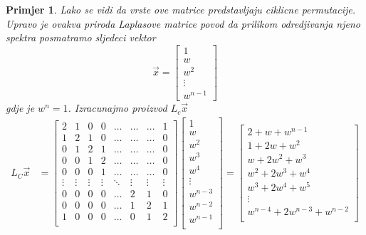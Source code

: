 \documentclass[11pt]{article}
\newtheorem{example}{Primjer}
\begin{document}
\begin{example}
	
	Lako se vidi da vrste ove matrice predstavljaju ciklicne permutacije. Upravo je ovakva priroda Laplasove matrice povod da prilikom odredjivanja njeno spektra posmatramo sljedeci vektor 
	\[ \vec{x} =
	\begin{bmatrix}
	1 \\
	w \\
	w^2\\
	\vdots \\
	w^{n-1}
	\end{bmatrix}
	\]
	gdje je $w^n = 1$. Izracunajmo proizvod $L_c \vec{x}$
	\[
	\begin{split}
	  	L_C \vec{x} & = 
		\begin{bmatrix}
		2 & 1 & 0 & 0 & \dots & \dots & \dots & 1 \\
		1 & 2 & 1 & 0 & \dots & \dots & \dots & 0 \\
		0 & 1 & 2 & 1 & \dots & \dots & \dots & 0 \\
		0 & 0 & 1 & 2 & \dots & \dots & \dots & 0 \\
		0 & 0 & 0 & 1 & \dots & \dots & \dots & 0 \\
		\vdots  & \vdots  & \vdots  & \vdots  & \ddots & \vdots & \vdots & \vdots  \\
		0 & 0 & 0 & 0 & \dots & 2 & 1 & 0 \\
		0 & 0 & 0 & 0 & \dots & 1 & 2 & 1 \\
		1 & 0 & 0 & 0 & \dots & 0 & 1 & 2 \\
		\end{bmatrix}
		 \begin{bmatrix}
		1 \\
		w \\
		w^2 \\
		w^3 \\
		w^4 \\
		\vdots \\
		w^{n-3} \\
		w^{n-2} \\
		w^{n-1} \\
		\end{bmatrix} 
		=
		\begin{bmatrix}
		 2 + w + w^{n-1} \\
		1 + 2w + w^2 \\
		w + 2w^2 + w^3 \\
		w^2 + 2w^3 + w^4 \\
		w^3 + 2w^4 + w^5 \\
		\vdots \\
		w^{n-4} + 2w^{n-3} + w^{n-2} \\

\end{bmatrix}
\end{split}\]
\end{example}
\end{document}
